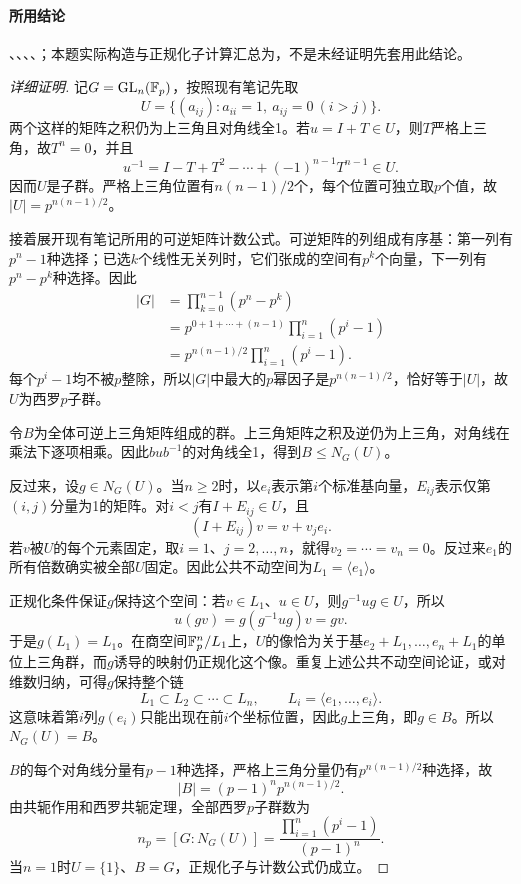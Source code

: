\paragraph{所用结论}、、、、；本题实际构造与正规化子计算汇总为，不是未经证明先套用此结论。
\begin{proof}[详细证明]
记$G=\operatorname{GL}_n(\mathbb F_p)$，按照现有笔记先取
\[
U=\{(a_{ij}):a_{ii}=1,\ a_{ij}=0\ (i>j)\}.
\]
两个这样的矩阵之积仍为上三角且对角线全1。若$u=I+T\in U$，则$T$严格上三角，故$T^n=0$，并且
\[
u^{-1}=I-T+T^2-\cdots+(-1)^{n-1}T^{n-1}\in U.
\]
因而$U$是子群。严格上三角位置有$n(n-1)/2$个，每个位置可独立取$p$个值，故$|U|=p^{n(n-1)/2}$。

接着展开现有笔记所用的可逆矩阵计数公式。可逆矩阵的列组成有序基：第一列有$p^n-1$种选择；已选$k$个线性无关列时，它们张成的空间有$p^k$个向量，下一列有$p^n-p^k$种选择。因此
\begin{align*}
|G|&=\prod_{k=0}^{n-1}(p^n-p^k)\\
&=p^{0+1+\cdots+(n-1)}\prod_{i=1}^n(p^i-1)\\
&=p^{n(n-1)/2}\prod_{i=1}^n(p^i-1).
\end{align*}
每个$p^i-1$均不被$p$整除，所以$|G|$中最大的$p$幂因子是$p^{n(n-1)/2}$，恰好等于$|U|$，故$U$为西罗$p$子群。

令$B$为全体可逆上三角矩阵组成的群。上三角矩阵之积及逆仍为上三角，对角线在乘法下逐项相乘。因此$bub^{-1}$的对角线全1，得到$B\le N_G(U)$。

反过来，设$g\in N_G(U)$。当$n\ge2$时，以$e_i$表示第$i$个标准基向量，$E_{ij}$表示仅第$(i,j)$分量为1的矩阵。对$i<j$有$I+E_{ij}\in U$，且
\[
(I+E_{ij})v=v+v_je_i.
\]
若$v$被$U$的每个元素固定，取$i=1$、$j=2,\ldots,n$，就得$v_2=\cdots=v_n=0$。反过来$e_1$的所有倍数确实被全部$U$固定。因此公共不动空间为$L_1=\langle e_1\rangle$。

正规化条件保证$g$保持这个空间：若$v\in L_1$、$u\in U$，则$g^{-1}ug\in U$，所以
\[
u(gv)=g(g^{-1}ug)v=gv.
\]
于是$g(L_1)=L_1$。在商空间$\mathbb F_p^n/L_1$上，$U$的像恰为关于基$e_2+L_1,\ldots,e_n+L_1$的单位上三角群，而$g$诱导的映射仍正规化这个像。重复上述公共不动空间论证，或对维数归纳，可得$g$保持整个链
\[
L_1\subset L_2\subset\cdots\subset L_n,
\qquad L_i=\langle e_1,\ldots,e_i\rangle.
\]
这意味着第$i$列$g(e_i)$只能出现在前$i$个坐标位置，因此$g$上三角，即$g\in B$。所以$N_G(U)=B$。

$B$的每个对角线分量有$p-1$种选择，严格上三角分量仍有$p^{n(n-1)/2}$种选择，故
\[
|B|=(p-1)^np^{n(n-1)/2}.
\]
由共轭作用和西罗共轭定理，全部西罗$p$子群数为
\[
n_p=[G:N_G(U)]
=\frac{\prod_{i=1}^n(p^i-1)}{(p-1)^n}.
\]
当$n=1$时$U=\{1\}$、$B=G$，正规化子与计数公式仍成立。
\end{proof}
